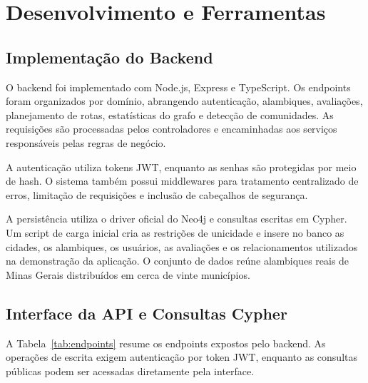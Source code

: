 \documentclass{jaes}
\begin{document}
\section{Desenvolvimento e Ferramentas}

\subsection{Implementação do Backend}

O backend foi implementado com Node.js, Express e TypeScript. Os endpoints foram organizados por domínio, abrangendo autenticação, alambiques, avaliações, planejamento de rotas, estatísticas do grafo e detecção de comunidades. As requisições são processadas pelos controladores e encaminhadas aos serviços responsáveis pelas regras de negócio.

A autenticação utiliza tokens JWT, enquanto as senhas são protegidas por meio de hash. O sistema também possui middlewares para tratamento centralizado de erros, limitação de requisições e inclusão de cabeçalhos de segurança.

A persistência utiliza o driver oficial do Neo4j e consultas escritas em Cypher. Um script de carga inicial cria as restrições de unicidade e insere no banco as cidades, os alambiques, os usuários, as avaliações e os relacionamentos utilizados na demonstração da aplicação. O conjunto de dados reúne alambiques reais de Minas Gerais distribuídos em cerca de vinte municípios.

\subsection{Interface da API e Consultas Cypher}

A Tabela~\ref{tab:endpoints} resume os endpoints expostos pelo backend. As operações de escrita exigem autenticação por token JWT, enquanto as consultas públicas podem ser acessadas diretamente pela interface.
\end{document}

